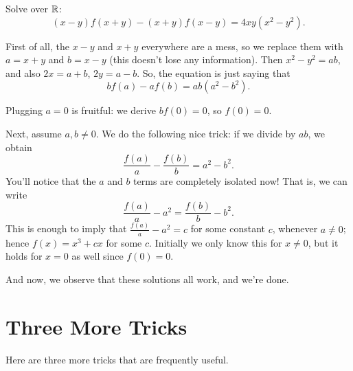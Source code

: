 \begin{example}
	\label{ex:singapore}
	Solve over $\mathbb R$:
	\[ (x-y)f(x+y) - (x+y)f(x-y) = 4xy(x^2-y^2). \]
\end{example}
\begin{soln}
	First of all, the $x-y$ and $x+y$ everywhere are a mess,
	so we replace them with $a = x+y$ and $b = x-y$
	(this doesn't lose any information).
	Then $x^2-y^2 = ab$, and also $2x = a+b$, $2y = a-b$.
	So, the equation is just saying that
	\[ bf(a) - af(b) = ab(a^2-b^2). \]

	Plugging  $a=0$ is fruitful: we derive
	$bf(0) = 0$, so $f(0) = 0$.
	
	Next, assume $a,b \neq 0$.
	We do the following nice trick:
	if we divide by $ab$, we obtain
	\[ \frac{f(a)}{a} - \frac{f(b)}{b} = a^2 - b^2. \]
	You'll notice that the $a$ and $b$ terms are completely isolated now!
	That is, we can write
	\[ \frac{f(a)}{a} - a^2 = \frac{f(b)}{b} - b^2. \]
	This is enough to imply that $\frac{f(a)}{a} - a^2 = c$ for some constant $c$,
	whenever $a \neq 0$; hence $f(x) = x^3 + cx$ for some $c$.
	Initially we only know this for $x \neq 0$,
	but it holds for $x=0$ as well since $f(0) = 0$.

	And now, we observe that these solutions all work, and we're done.
\end{soln}

\section{Three More Tricks}
Here are three more tricks that are frequently useful.

